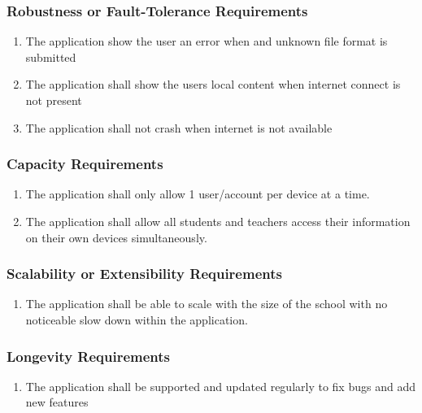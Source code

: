 \documentclass[]{article}
\begin{document}
\subsubsection{Robustness or Fault-Tolerance Requirements}
\label{ssub:robustness_or_fault_tolerance_requirements}
\begin{enumerate}[{PR}1. ]
	\item The application show the user an error when and unknown file format is submitted
	\item The application shall show the users local content when internet connect is not present
	\item The application shall not crash when internet is not available 
\end{enumerate}

\subsubsection{Capacity Requirements}
\label{ssub:capacity_requirements}
\begin{enumerate}[{PR}1. ]
	\item The application shall only allow 1 user/account per device at a time.
	\item The application shall allow all students and teachers access their information on their own devices simultaneously.
\end{enumerate}

\subsubsection{Scalability or Extensibility Requirements}
\label{ssub:scalability_or_extensibility_requirements}
\begin{enumerate}[{PR}1. ]
	\item The application shall be able to scale with the size of the school with no noticeable slow down within the application.
\end{enumerate}

\subsubsection{Longevity Requirements}
\label{ssub:longevity_requirements}
\begin{enumerate}[{PR}1. ]
	\item The application shall be supported and updated regularly to fix bugs and
add new features
\end{enumerate}
\end{document}
